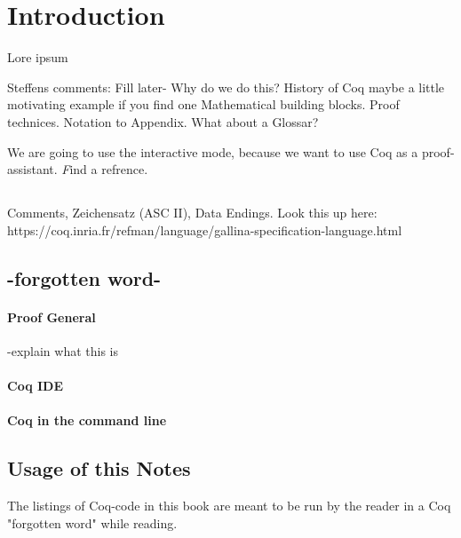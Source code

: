 \section{Introduction}

Lore ipsum \cite{PACGGHSY}

Steffens comments:
Fill later-
 Why do we do this?
 History of Coq
 maybe a little motivating example if you find one
 Mathematical building blocks. Proof technices. Notation to Appendix.
 What about a Glossar?

We are going to use the interactive mode, because we want to use Coq as a proof-assistant. {\emph Find a refrence.}

\subsection{}

Comments, Zeichensatz (ASC II), Data Endings.
Look this up here:\\
https://coq.inria.fr/refman/language/gallina-specification-language.html
\subsection{-forgotten word-}



\paragraph{Proof General}
-explain what this is


\paragraph{Coq IDE}

\paragraph{Coq in the command line}




\subsection{Usage of this Notes}
The listings of Coq-code in this book are meant to be run by the reader in a Coq "forgotten word" while reading.
